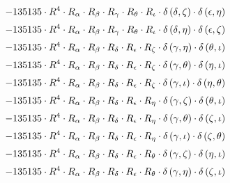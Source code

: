 \begin{subequations}
\begin{gather}
 \\[0.2em] \notag 		 - 135135 \cdot R^{4} \cdot R_{\alpha{}} \cdot R_{\beta{}} \cdot R_{\gamma{}} \cdot R_{\theta{}} \cdot R_{\iota{}} \cdot \delta{}\left(\delta{}, \zeta{}\right) \cdot \delta{}\left(\epsilon{}, \eta{}\right) 
 \\[0.2em] \notag 		 - 135135 \cdot R^{4} \cdot R_{\alpha{}} \cdot R_{\beta{}} \cdot R_{\gamma{}} \cdot R_{\theta{}} \cdot R_{\iota{}} \cdot \delta{}\left(\delta{}, \eta{}\right) \cdot \delta{}\left(\epsilon{}, \zeta{}\right) 
 \\[0.2em] \notag 		 - 135135 \cdot R^{4} \cdot R_{\alpha{}} \cdot R_{\beta{}} \cdot R_{\delta{}} \cdot R_{\epsilon{}} \cdot R_{\zeta{}} \cdot \delta{}\left(\gamma{}, \eta{}\right) \cdot \delta{}\left(\theta{}, \iota{}\right) 
 \\[0.2em] \notag 		 - 135135 \cdot R^{4} \cdot R_{\alpha{}} \cdot R_{\beta{}} \cdot R_{\delta{}} \cdot R_{\epsilon{}} \cdot R_{\zeta{}} \cdot \delta{}\left(\gamma{}, \theta{}\right) \cdot \delta{}\left(\eta{}, \iota{}\right) 
 \\[0.2em] \notag 		 - 135135 \cdot R^{4} \cdot R_{\alpha{}} \cdot R_{\beta{}} \cdot R_{\delta{}} \cdot R_{\epsilon{}} \cdot R_{\zeta{}} \cdot \delta{}\left(\gamma{}, \iota{}\right) \cdot \delta{}\left(\eta{}, \theta{}\right) 
 \\[0.2em] \notag 		 - 135135 \cdot R^{4} \cdot R_{\alpha{}} \cdot R_{\beta{}} \cdot R_{\delta{}} \cdot R_{\epsilon{}} \cdot R_{\eta{}} \cdot \delta{}\left(\gamma{}, \zeta{}\right) \cdot \delta{}\left(\theta{}, \iota{}\right) 
 \\[0.2em] \notag 		 - 135135 \cdot R^{4} \cdot R_{\alpha{}} \cdot R_{\beta{}} \cdot R_{\delta{}} \cdot R_{\epsilon{}} \cdot R_{\eta{}} \cdot \delta{}\left(\gamma{}, \theta{}\right) \cdot \delta{}\left(\zeta{}, \iota{}\right) 
 \\[0.2em] \notag 		 - 135135 \cdot R^{4} \cdot R_{\alpha{}} \cdot R_{\beta{}} \cdot R_{\delta{}} \cdot R_{\epsilon{}} \cdot R_{\eta{}} \cdot \delta{}\left(\gamma{}, \iota{}\right) \cdot \delta{}\left(\zeta{}, \theta{}\right) 
 \\[0.2em] \notag 		 - 135135 \cdot R^{4} \cdot R_{\alpha{}} \cdot R_{\beta{}} \cdot R_{\delta{}} \cdot R_{\epsilon{}} \cdot R_{\theta{}} \cdot \delta{}\left(\gamma{}, \zeta{}\right) \cdot \delta{}\left(\eta{}, \iota{}\right) 
 \\[0.2em] \notag 		 - 135135 \cdot R^{4} \cdot R_{\alpha{}} \cdot R_{\beta{}} \cdot R_{\delta{}} \cdot R_{\epsilon{}} \cdot R_{\theta{}} \cdot \delta{}\left(\gamma{}, \eta{}\right) \cdot \delta{}\left(\zeta{}, \iota{}\right) 

\end{gather}
\end{subequations}
